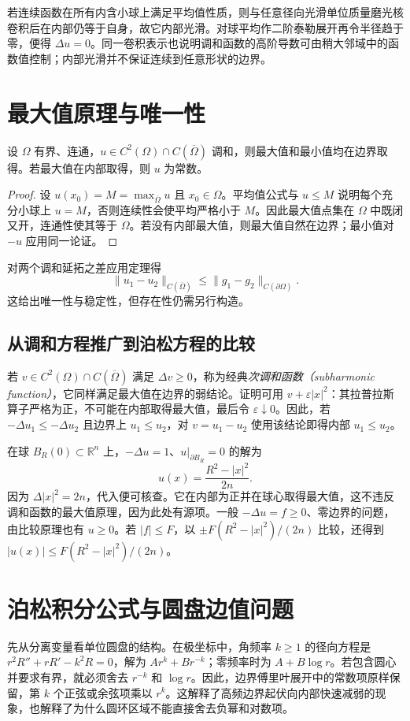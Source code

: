 若连续函数在所有内含小球上满足平均值性质，则与任意径向光滑单位质量磨光核卷积后在内部仍等于自身，故它内部光滑。对球平均作二阶泰勒展开再令半径趋于零，便得 $\Delta u=0$。同一卷积表示也说明调和函数的高阶导数可由稍大邻域中的函数值控制；内部光滑并不保证连续到任意形状的边界。

\section{最大值原理与唯一性}
\begin{theorem}
设 $\Omega$ 有界、连通，$u\in C^2(\Omega)\cap C(\overline\Omega)$ 调和，则最大值和最小值均在边界取得。若最大值在内部取得，则 $u$ 为常数。
\end{theorem}
\begin{proof}
设 $u(x_0)=M=\max_{\overline\Omega}u$ 且 $x_0\in\Omega$。平均值公式与 $u\le M$ 说明每个充分小球上 $u=M$，否则连续性会使平均严格小于 $M$。因此最大值点集在 $\Omega$ 中既闭又开，连通性使其等于 $\Omega$。若没有内部最大值，则最大值自然在边界；最小值对 $-u$ 应用同一论证。
\end{proof}
对两个调和延拓之差应用定理得
\[
 \|u_1-u_2\|_{C(\overline\Omega)}\le\|g_1-g_2\|_{C(\partial\Omega)}.
\]
这给出唯一性与稳定性，但存在性仍需另行构造。

\subsection{从调和方程推广到泊松方程的比较}
若 $v\in C^2(\Omega)\cap C(\overline\Omega)$ 满足 $\Delta v\ge0$，称为经典\emph{次调和函数（subharmonic function）}，它同样满足最大值在边界的弱结论。证明可用 $v+\varepsilon|x|^2$：其拉普拉斯算子严格为正，不可能在内部取得最大值，最后令 $\varepsilon\downarrow0$。因此，若 $-\Delta u_1\le-\Delta u_2$ 且边界上 $u_1\le u_2$，对 $v=u_1-u_2$ 使用该结论即得内部 $u_1\le u_2$。

\begin{example}[正源项产生非负解]
在球 $B_R(0)\subset\mathbb R^n$ 上，$-\Delta u=1$、$u|_{\partial B_R}=0$ 的解为
\[
 u(x)=\frac{R^2-|x|^2}{2n}.
\]
因为 $\Delta|x|^2=2n$，代入便可核查。它在内部为正并在球心取得最大值，这不违反调和函数的最大值原理，因为此处有源项。一般 $-\Delta u=f\ge0$、零边界的问题，由比较原理也有 $u\ge0$。若 $|f|\le F$，以 $\pm F(R^2-|x|^2)/(2n)$ 比较，还得到 $|u(x)|\le F(R^2-|x|^2)/(2n)$。
\end{example}

\section{泊松积分公式与圆盘边值问题}
先从分离变量看单位圆盘的结构。在极坐标中，角频率 $k\ge1$ 的径向方程是 $r^2R''+rR'-k^2R=0$，解为 $Ar^k+Br^{-k}$；零频率时为 $A+B\log r$。若包含圆心并要求有界，就必须舍去 $r^{-k}$ 和 $\log r$。因此，边界傅里叶展开中的常数项原样保留，第 $k$ 个正弦或余弦项乘以 $r^k$。这解释了高频边界起伏向内部快速减弱的现象，也解释了为什么圆环区域不能直接舍去负幂和对数项。

